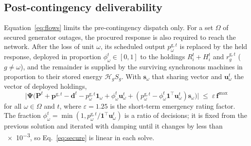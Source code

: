 \subsection{Post-contingency deliverability}
\label{sec:secure-form}

Equation~\eqref{eq:flows} limits the pre-contingency dispatch only. For a set
$\Omega$ of secured generator outages, the procured response is also required
to reach the network. After the loss of unit $\omega$, its scheduled output
$p^{\mathrm{g},t}_\omega$ is replaced by the held response, deployed in
proportion $\phi^t_\omega \in [0,1]$ to the holdings $R_i^t + H_i^t$ and
$r^{\mathrm{g},t}_g$ ($g \ne \omega$), and the remainder is supplied by the
surviving synchronous machines in proportion to their stored energy
$\mathcal{H}_g S_g$. With $\mathbf{s}_\omega$ that sharing vector and
$\mathbf{u}^t_\omega$ the vector of deployed holdings,
%
\begin{equation}
  \big| \boldsymbol{\Psi} \big( \mathbf{P}^t + \mathbf{p}^{\mathrm{g},t}
    - \mathbf{d}^t
    - p^{\mathrm{g},t}_\omega \mathbf{1}_\omega
    + \phi^t_\omega \mathbf{u}^t_\omega
    + ( p^{\mathrm{g},t}_\omega - \phi^t_\omega
        \mathbf{1}^{\!\top} \mathbf{u}^t_\omega ) \mathbf{s}_\omega
    \big) \big| \;\le\; \varepsilon \, \mathbf{f}^{\max}
  \label{eq:secure}
\end{equation}
%
for all $\omega \in \Omega$ and $t$, where $\varepsilon = 1.25$ is the
short-term emergency rating factor. The fraction
$\phi^t_\omega = \min(1, p^{\mathrm{g},t}_\omega / \mathbf{1}^{\!\top}
\mathbf{u}^t_\omega)$ is a ratio of decisions; it is fixed from the previous
solution and iterated with damping until it changes by less than
\num{e-3}, so Eq.~\eqref{eq:secure} is linear in each solve.
